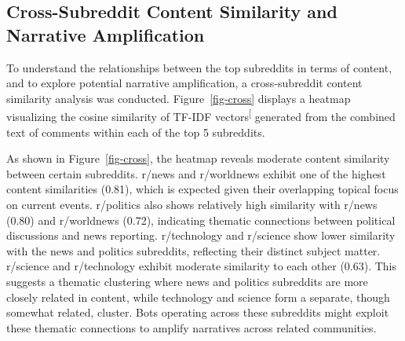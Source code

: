 \documentclass[
  12pt,
  letterpaper,
  DIV=11,
  numbers=noendperiod,
  abstract]{scrartcl}
\begin{document}
\subsection{Cross-Subreddit Content Similarity and Narrative
Amplification}\label{cross-subreddit-content-similarity-and-narrative-amplification}

To understand the relationships between the top subreddits in terms of
content, and to explore potential narrative amplification, a
cross-subreddit content similarity analysis was conducted.
Figure~\ref{fig-cross} displays a heatmap visualizing the cosine
similarity of TF-IDF
vectors\textsuperscript{{[}\citeproc{ref-salton1988term}{29}{]}}
generated from the combined text of comments within each of the top 5
subreddits.

As shown in Figure~\ref{fig-cross}, the heatmap reveals moderate content
similarity between certain subreddits. r/news and r/worldnews exhibit
one of the highest content similarities (0.81), which is expected given
their overlapping topical focus on current events. r/politics also shows
relatively high similarity with r/news (0.80) and r/worldnews (0.72),
indicating thematic connections between political discussions and news
reporting. r/technology and r/science show lower similarity with the
news and politics subreddits, reflecting their distinct subject matter.
r/science and r/technology exhibit moderate similarity to each other
(0.63). This suggests a thematic clustering where news and politics
subreddits are more closely related in content, while technology and
science form a separate, though somewhat related, cluster. Bots
operating across these subreddits might exploit these thematic
connections to amplify narratives across related communities.
\end{document}

